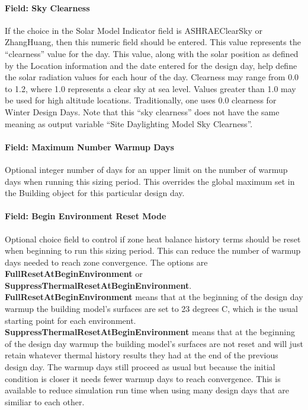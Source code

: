 \paragraph{Field: Sky Clearness}\label{field-sky-clearness}

If the choice in the Solar Model Indicator field is ASHRAEClearSky or ZhangHuang, then this numeric field should be entered. This value represents the ``clearness'' value for the day. This value, along with the solar position as defined by the Location information and the date entered for the design day, help define the solar radiation values for each hour of the day. Clearness may range from 0.0 to 1.2, where 1.0 represents a clear sky at sea level. Values greater than 1.0 may be used for high altitude locations. Traditionally, one uses 0.0 clearness for Winter Design Days. Note that this ``sky clearness'' does not have the same meaning as output variable ``Site Daylighting Model Sky Clearness''.

\paragraph{Field: Maximum Number Warmup Days}\label{field-max-num-warm-days}

Optional integer number of days for an upper limit on the number of warmup days when running this sizing period.  This overrides the global maximum set in the Building object for this particular design day.

\paragraph{Field: Begin Environment Reset Mode}\label{field-beg-env-reset-mode}

Optional choice field to control if zone heat balance history terms should be reset when beginning to run this sizing period.  This can reduce the number of warmup days needed to reach zone convergence.  The options are \textbf{FullResetAtBeginEnvironment} or \textbf{SuppressThermalResetAtBeginEnvironment}.  \textbf{FullResetAtBeginEnvironment} means that at the beginning of the design day warmup the building model's surfaces are set to 23 degrees C, which is the usual starting point for each environment.  \textbf{SuppressThermalResetAtBeginEnvironment} means that at the beginning of the design day warmup the building model's surfaces are not reset and will just retain whatever thermal history results they had at the end of the previous design day.  The warmup days still proceed as usual but because the initial condition is closer it needs fewer warmup days to reach convergence.  This is available to reduce simulation run time when using many design days that are similiar to each other.


